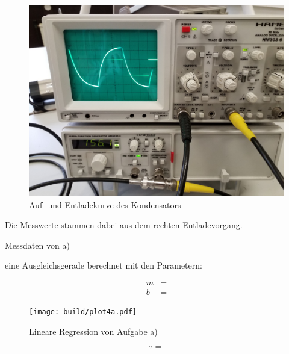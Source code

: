   \begin{figure}[H]
    \includegraphics[width=\textwidth]{images/4a.jpg}
    \centering
    \caption{Auf- und Entladekurve des Kondensators}
    \label{fig:4ajpg}
  \end{figure}

  Die Messwerte stammen dabei aus dem rechten Entladevorgang.

  \begin{table}[H]
        \centering
        \caption{Messdaten von a)}
         
        \label{tab:data4a}
  \end{table}

   \cite{scipy} eine
  Ausgleichsgerade berechnet mit den Parametern:

  \begin{align*}
    m &= \text{}\\
    b &= \text{}
  \end{align*}
  
  
  \begin{figure}[H]
    \texttt{[image: build/plot4a.pdf]}
    \centering
    \caption{Lineare Regression von Aufgabe a)}
    \label{fig:4a}
  \end{figure}

  \begin{equation}
  \tau = \text{}
  \end{equation}


